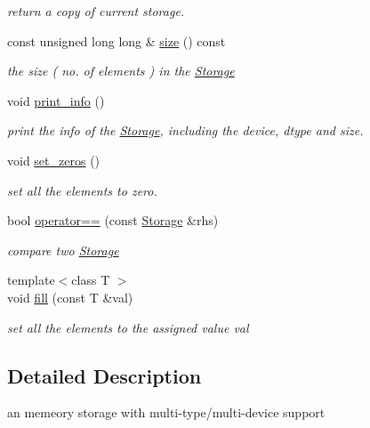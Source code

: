 \begin{DoxyCompactItemize}
\begin{DoxyCompactList}\small\item\em return a copy of current storage. \end{DoxyCompactList}\item 
const unsigned long long \& \hyperlink{classcytnx_1_1Storage_aaf36262622abdab03c90b713c454f78e}{size} () const
\begin{DoxyCompactList}\small\item\em the size ( no. of elements ) in the \hyperlink{classcytnx_1_1Storage}{Storage} \end{DoxyCompactList}\item 
\mbox{\label{classcytnx_1_1Storage_a0ae2bee5e15c651b05dadf5dbbdb36f5}} 
void \hyperlink{classcytnx_1_1Storage_a0ae2bee5e15c651b05dadf5dbbdb36f5}{print\+\_\+info} ()
\begin{DoxyCompactList}\small\item\em print the info of the \hyperlink{classcytnx_1_1Storage}{Storage}, including the device, dtype and size. \end{DoxyCompactList}\item 
void \hyperlink{classcytnx_1_1Storage_a7e854529c99108b0acc3e5e2b185244b}{set\+\_\+zeros} ()
\begin{DoxyCompactList}\small\item\em set all the elements to zero. \end{DoxyCompactList}\item 
bool \hyperlink{classcytnx_1_1Storage_ad304e00cf3d472ea0355af6b40c4529d}{operator==} (const \hyperlink{classcytnx_1_1Storage}{Storage} \&rhs)
\begin{DoxyCompactList}\small\item\em compare two \hyperlink{classcytnx_1_1Storage}{Storage} \end{DoxyCompactList}\item 
{\footnotesize template$<$class T $>$ }\\void \hyperlink{classcytnx_1_1Storage_a48f0424f051a4b3a821eb964be4cd5db}{fill} (const T \&val)
\begin{DoxyCompactList}\small\item\em set all the elements to the assigned value val \end{DoxyCompactList}\end{DoxyCompactItemize}


\subsection{Detailed Description}
an memeory storage with multi-\/type/multi-\/device support 

